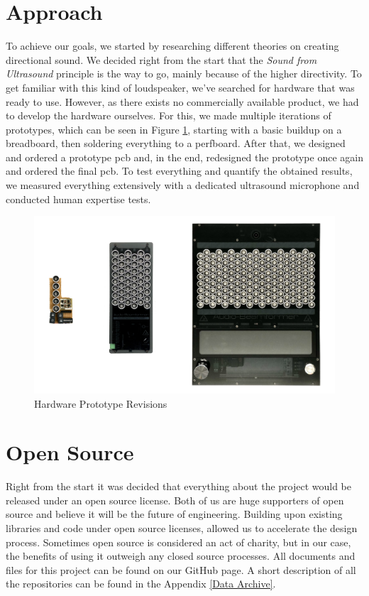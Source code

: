 \section{Approach}
To achieve our goals, we started by researching different theories on creating directional sound.
We decided right from the start that the \textit{Sound from Ultrasound} principle is the way to go, mainly because of the higher directivity.
To get familiar with this kind of loudspeaker, we've searched for hardware that was ready to use. However, as there exists no commercially available product, we had to develop the hardware ourselves.
For this, we made multiple iterations of prototypes, which can be seen in Figure \ref{fig:prototype_revisions}, starting with a basic buildup on a breadboard, then soldering everything to a perfboard. After that, we designed and ordered a prototype \acrshort{pcb} and, in the end, redesigned the prototype once again and ordered the final \acrshort{pcb}.  
To test everything and quantify the obtained results, we measured everything extensively with a dedicated ultrasound microphone and conducted human expertise tests.

\begin{figure}[h!]
	\centering
	\includegraphics[width=\textwidth]{images/1_Introduction/Approach.jpg}
	\vspace{-0.4cm}
    \caption{Hardware Prototype Revisions}
    \label{fig:prototype_revisions}
\end{figure}


\section{Open Source}
Right from the start it was decided that everything about the project would be released under an open source license. Both of us are huge supporters of open source and believe it will be the future of engineering. Building upon existing libraries and code under open source licenses, allowed us to accelerate the design process. Sometimes open source is considered an act of charity, but in our case, the benefits of using it outweigh any closed source processes. All documents and files for this project can be found on our GitHub page. A short description of all the repositories can be found in the Appendix \ref{Data Archive}.
